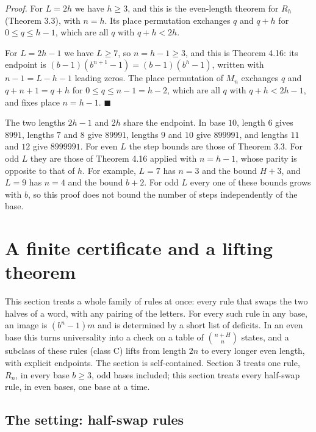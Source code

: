 \documentclass[11pt,letterpaper]{article}
\theoremstyle{paperstyle}
\theoremstyle{paperstyledef}
\theoremstyle{paperstylerem}
\begin{document}
\emph{Proof.} For \(L = 2h\) we have \(h \geq 3\), and this is the even-length theorem for \(R_h\) (Theorem 3.3), with \(n = h\). Its place permutation exchanges \(q\) and \(q + h\) for \(0 \leq q \leq h-1\), which are all \(q\) with \(q + h < 2h\).

For \(L = 2h - 1\) we have \(L \geq 7\), so \(n = h - 1 \geq 3\), and this is Theorem 4.16: its endpoint is \((b-1)(b^{n+1} - 1) = (b-1)(b^h - 1)\), written with \(n - 1 = L - h - 1\) leading zeros. The place permutation of \(M_n\) exchanges \(q\) and \(q + n + 1 = q + h\) for \(0 \leq q \leq n - 1 = h - 2\), which are all \(q\) with \(q + h < 2h - 1\), and fixes place \(n = h - 1\). \(\blacksquare\)

The two lengths \(2h - 1\) and \(2h\) share the endpoint. In base \(10\), length \(6\) gives \(8991\), lengths \(7\) and \(8\) give \(89991\), lengths \(9\) and \(10\) give \(899991\), and lengths \(11\) and \(12\) give \(8999991\). For even \(L\) the step bounds are those of Theorem 3.3. For odd \(L\) they are those of Theorem 4.16 applied with \(n = h - 1\), whose parity is opposite to that of \(h\). For example, \(L = 7\) has \(n = 3\) and the bound \(H + 3\), and \(L = 9\) has \(n = 4\) and the bound \(b + 2\). For odd \(L\) every one of these bounds grows with \(b\), so this proof does not bound the number of steps independently of the base.

\section{A finite certificate and a lifting theorem}\label{a-finite-certificate-and-a-lifting-theorem}

This section treats a whole family of rules at once: every rule that swaps the two halves of a word, with any pairing of the letters. For every such rule in any base, an image is \((b^n - 1)m\) and is determined by a short list of deficits. In an even base this turns universality into a check on a table of \(\binom{n+H}{n}\) states, and a subclass of these rules (class C) lifts from length \(2n\) to every longer even length, with explicit endpoints. The section is self-contained. Section 3 treats one rule, \(R_n\), in every base \(b \ge 3\), odd bases included; this section treats every half-swap rule, in even bases, one base at a time.

\subsection{The setting: half-swap rules}\label{the-setting-half-swap-rules}
\end{document}
